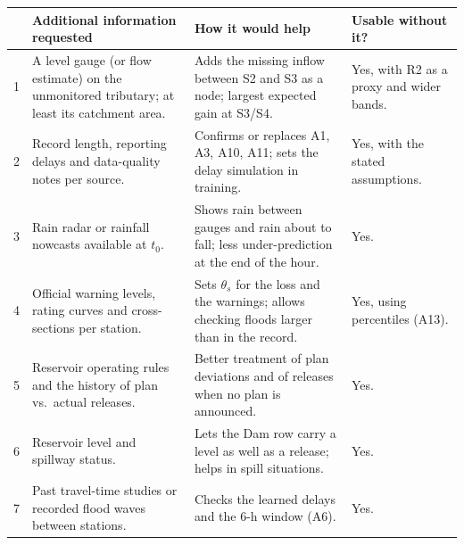 \begin{longtable}{@{}p{0.4cm}p{4.6cm}p{6.6cm}p{4.0cm}@{}}
\toprule
& \textbf{Additional information requested} & \textbf{How it would help} & \textbf{Usable without it?}\\
\midrule\endhead
1 & A level gauge (or flow estimate) on the unmonitored tributary; at least its catchment area. & Adds the missing inflow between S2 and S3 as a node; largest expected gain at S3/S4. & Yes, with R2 as a proxy and wider bands. \\
2 & Record length, reporting delays and data-quality notes per source. & Confirms or replaces A1, A3, A10, A11; sets the delay simulation in training. & Yes, with the stated assumptions. \\
3 & Rain radar or rainfall nowcasts available at $t_0$. & Shows rain between gauges and rain about to fall; less under-prediction at the end of the hour. & Yes. \\
4 & Official warning levels, rating curves and cross-sections per station. & Sets $\theta_s$ for the loss and the warnings; allows checking floods larger than in the record. & Yes, using percentiles (A13). \\
5 & Reservoir operating rules and the history of plan vs.\ actual releases. & Better treatment of plan deviations and of releases when no plan is announced. & Yes. \\
6 & Reservoir level and spillway status. & Lets the Dam row carry a level as well as a release; helps in spill situations. & Yes. \\
7 & Past travel-time studies or recorded flood waves between stations. & Checks the learned delays and the 6-h window (A6). & Yes. \\
\bottomrule
\end{longtable}
